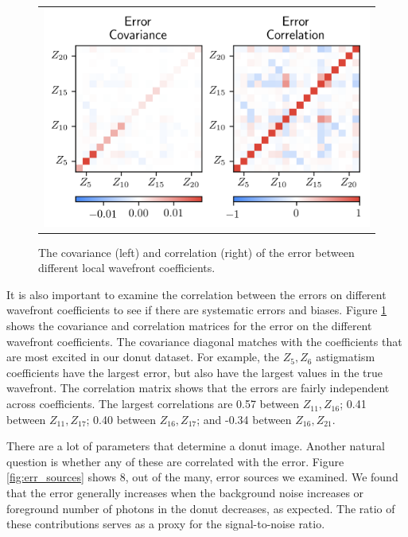 \begin{figure}[!htbp]
\begin{center}
\begin{tabular}{c}
\includegraphics[width=\textwidth]{figs/cnn/cov_cor.png}
\end{tabular}
\end{center}
\caption[Wavefront Coefficient Error Covariance and Correlation]{The covariance (left) and correlation (right) of the error between different local wavefront coefficients.\label{fig:cov_cor}}
\end{figure}

It is also important to examine the correlation between the errors on different wavefront coefficients to see if there are systematic errors and biases. Figure \ref{fig:cov_cor} shows the covariance and correlation matrices for the error on the different wavefront coefficients. The covariance diagonal matches with the coefficients that are most excited in our donut dataset. For example, the $Z_5, Z_6$ astigmatism coefficients have the largest error, but also have the largest values in the true wavefront. The correlation matrix shows that the errors are fairly independent across coefficients. The largest correlations are 0.57 between $Z_{11}, Z_{16}$; 0.41 between $Z_{11},Z_{17}$; 0.40 between $Z_{16},Z_{17}$; and -0.34 between $Z_{16}, Z_{21}$.

There are a lot of parameters that determine a donut image. Another natural question is whether any of these are correlated with the error. Figure \ref{fig:err_sources} shows 8, out of the many, error sources we examined. We found that the error generally increases when the background noise increases or foreground number of photons in the donut decreases, as expected. The ratio of these contributions serves as a proxy for the signal-to-noise ratio.

